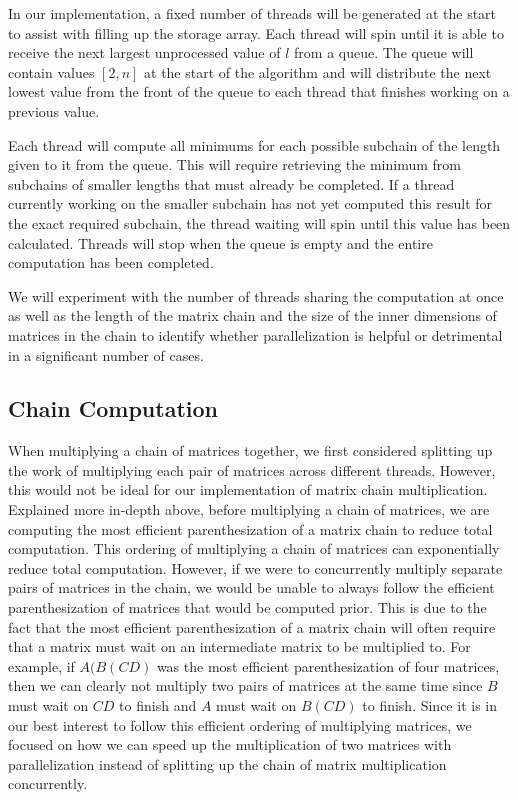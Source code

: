 \documentclass[conference,leqno]{IEEEtran}
\begin{document}
In our implementation, a fixed number of threads will be generated at the start to assist with filling up the storage array. Each thread will spin until it is able to receive the next largest unprocessed value of $l$ from a queue. The queue will contain values $[2, n]$ at the start of the algorithm and will distribute the next lowest value from the front of the queue to each thread that finishes working on a previous value.

Each thread will compute all minimums for each possible subchain of the length given to it from the queue. This will require retrieving the minimum from subchains of smaller lengths that must already be completed. If a thread currently working on the smaller subchain has not yet computed this result for the exact required subchain, the thread waiting will spin until this value has been calculated. Threads will stop when the queue is empty and the entire computation has been completed.

We will experiment with the number of threads sharing the computation at once as well as the length of the matrix chain and the size of the inner dimensions of matrices in the chain to identify whether parallelization is helpful or detrimental in a significant number of cases.

\subsection{Chain Computation}
When multiplying a chain of matrices together, we first considered splitting up the work of multiplying each pair of matrices across different threads. However, this would not be ideal for our implementation of matrix chain multiplication. Explained more in-depth above, before multiplying a chain of matrices, we are computing the most efficient parenthesization of a matrix chain to reduce total computation. This ordering of multiplying a chain of matrices can exponentially reduce total computation. However, if we were to concurrently multiply separate pairs of matrices in the chain, we would be unable to always follow the efficient parenthesization of matrices that would be computed prior. This is due to the fact that the most efficient parenthesization of a matrix chain will often require that a matrix must wait on an intermediate matrix to be multiplied to. For example, if $A(B(CD)$ was the most efficient parenthesization of four matrices, then we can clearly not multiply two pairs of matrices at the same time since $B$ must wait on $CD$ to finish and $A$ must wait on $B(CD)$ to finish. Since it is in our best interest to follow this efficient ordering of multiplying matrices, we focused on how we can speed up the multiplication of two matrices with parallelization instead of splitting up the chain of matrix multiplication concurrently.
\end{document}
